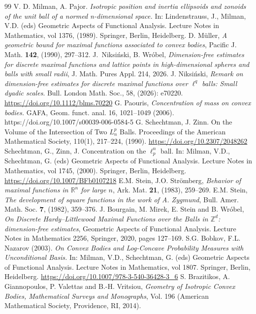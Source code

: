 \documentclass[10pt,a4paper]{amsart}
\numberwithin{equation}{section}
\begin{document}
\begin{thebibliography}{99}
 V. D. Milman, A. Pajor. \textit{Isotropic position and inertia ellipsoids and zonoids of the unit ball of a normed n-dimensional space.} In: Lindenstrauss, J., Milman, V.D. (eds) Geometric Aspects of Functional Analysis. Lecture Notes in Mathematics, vol 1376, (1989). Springer, Berlin, Heidelberg.
 D. M\"uller, \textit{A geometric bound for maximal functions associated to convex bodies}, Pacific J. Math. {\bf 142}, (1990), 297--312.
 J.~Niksi{\'n}ski, B. Wr\'obel, \textit{Dimension-free estimates for discrete maximal functions and lattice points in high-dimensional spheres and balls with small radii}, J. Math. Pures Appl. 214, 2026.
 J. Niksiński, \textit{Remark on dimension-free estimates for discrete maximal functions over $\ell^q$ balls: Small dyadic scales}. Bull. London Math. Soc., 58, (2026): e70220. \url{https://doi.org/10.1112/blms.70220}
 G. Paouris, \textit{Concentration of mass on convex bodies.} GAFA, Geom. funct. anal. 16, 1021–1049 (2006). https://doi.org/10.1007/s00039-006-0584-5
 G. Schechtman, J. Zinn. On the Volume of the Intersection of Two $L_n^p$ Balls. Proceedings of the American Mathematical Society, 110(1), 217–224, (1990). \url{https://doi.org/10.2307/2048262}
 Schechtman, G., Zinn, J. Concentration on the $\ell^n_p$ ball. In: Milman, V.D., Schechtman, G. (eds) Geometric Aspects of Functional Analysis. Lecture Notes in Mathematics, vol 1745, (2000). Springer, Berlin, Heidelberg. \url{https://doi.org/10.1007/BFb0107218}
 E.M. Stein, J.O. Str\"omberg, \textit{Behavior of maximal functions in $\mathbb{R}^n$ for large $n$}, Ark. Mat. {\bf 21}, (1983), 259--269.
 E.M. Stein, \textit{The development of square functions in the work of A. Zygmund}, Bull. Amer. Math. Soc. {\bf 7}, (1982), 359--376.
 J. Bourgain, M. Mirek, E. Stein and B. Wróbel, \emph{On Discrete Hardy--Littlewood Maximal Functions over the Balls in {$\mathbb{Z}^d$}: dimension-free estimates}, Geometric Aspects of Functional Analysis. Lecture Notes in Mathematics 2256, Springer, 2020, pages 127--169.
 S.G. Bobkov, F.L. Nazarov (2003). \textit{On Convex Bodies and Log-Concave Probability Measures with Unconditional Basis.} In: Milman, V.D., Schechtman, G. (eds) Geometric Aspects of Functional Analysis. Lecture Notes in Mathematics, vol 1807. Springer, Berlin, Heidelberg. \url{https://doi.org/10.1007/978-3-540-36428-3_6}
 S. Brazitikos, A. Giannopoulos, P. Valettas and B.-H. Vritsiou,\textit{ Geometry of Isotropic Convex Bodies, Mathematical Surveys and Monographs}, Vol. 196 (American Mathematical Society, Providence, RI, 2014).

\end{thebibliography}
\end{document}
